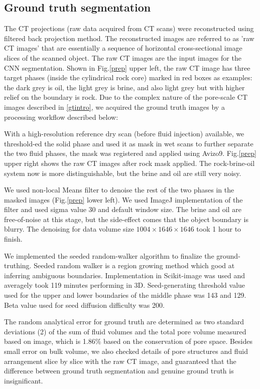 \documentclass[draft,linenumbers]{agujournal2018}
\begin{document}
\subsection{Ground truth segmentation}\label{gtmethod}
The CT projections (raw data acquired from CT scans) were reconstructed using filtered back projection method. The reconstructed images are referred to as 'raw CT images' that are essentially a sequence of horizontal cross-sectional image slices of the scanned object. The raw CT images are the input images for the CNN segmentation. Shown in Fig.\ref{prep} upper left, the raw CT image has three target phases (inside the cylindrical rock core) marked in red boxes as examples: the dark grey is oil, the light grey is brine, and also light grey but with higher relief on the boundary is rock. Due to the complex nature of the pore-scale CT images described in \ref{gtintro}, we acquired the ground truth images by a processing workflow described below:

With a high-resolution reference dry scan (before fluid injection) available, we threshold-ed the solid phase and used it as mask in wet scans to further separate the two fluid phases, the mask was registered and applied using Avizo9\texttrademark. Fig.\ref{prep} upper right shows the raw CT images after rock mask applied. The rock-brine-oil system now is more distinguishable, but the brine and oil are still very noisy.
 
We used non-local Means \citep{buades2005non} filter to denoise the rest of the two phases in the masked images (Fig.\ref{prep} lower left). We used ImageJ implementation of the filter and used sigma value 30 and default window size. The brine and oil are free-of-noise at this stage, but the side-effect comes that the object boundary is blurry. The denoising for data volume size $1004\times1646\times1646$ took 1 hour to finish.

We implemented the seeded random-walker algorithm \citep{grady2006random} to finalize the ground-truthing. Seeded random walker is a region growing method which good at inferring ambiguous boundaries. Implementation in Scikit-image was used and averagely took 119 minutes performing in 3D. Seed-generating threshold value used for the upper and lower boundaries of the middle phase was 143 and 129. Beta value used for seed diffusion difficulty was 200.

The random analytical error for ground truth are determined as two standard deviations (2\textsigma) of the sum of fluid volumes and the total pore volume measured based on image, which is 1.86\% based on the conservation of pore space. Besides small error on bulk volume, we also checked details of pore structures and fluid arrangement slice by slice with the raw CT image, and guaranteed that the difference between ground truth segmentation and genuine ground truth is insignificant.
\end{document}
